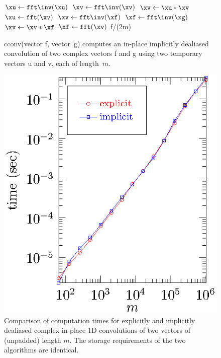 \documentclass[final]{siamltex}
\begin{document}
\begin{figure}[htbp]
\begin{minipage}{0.5\linewidth}
\begin{function}[H]
  \medskip
  $\xu \leftarrow \fft\inv(\xu)$\;
  $\xv \leftarrow \fft\inv(\xv)$\;
  $\xv \leftarrow \xu * \xv$\;
  $\xu \leftarrow \fft(\xv)$\;
  \medskip
  $\xv \leftarrow \fft\inv(\xf)$\;
  $\xf \leftarrow \fft\inv(\xg)$\;
  $\xv \leftarrow \xv * \xf$\;
  $\xf \leftarrow \fft(\xv)$\;
  \medskip
  \Return f/(2m)\;
\caption{cconv(vector {\sf f}, vector~{\sf g}) computes
an in-place implicitly dealiased convolution of two complex vectors {\sf f}
and {\sf g} using two temporary vectors {\sf u} and {\sf v}, each of
length~$m$.}\label{cconv}
\end{function}
\end{minipage}
%
\begin{minipage}{0.5\linewidth}
\begin{center}
\includegraphics{timing1c}
\caption{Comparison of computation times for explicitly and implicitly
dealiased complex in-place 1D convolutions of two vectors of
(unpadded) length $m$. The storage requirements of the two algorithms are
identical.}
\label{timing1c}
\end{center}
\end{minipage}
\end{figure}
\end{document}
